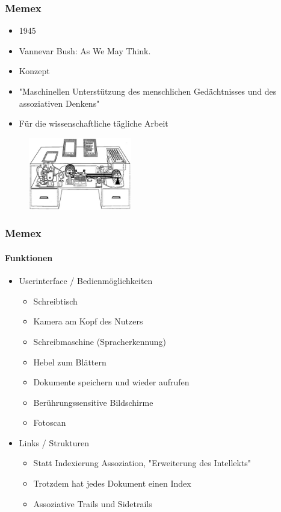 \begin{frame}
\frametitle{Memex}
	\begin{itemize}
		\item 1945
		\item Vannevar Bush: As We May Think.
		\item Konzept
		\item "Maschinellen Unterstützung des menschlichen Gedächtnisses und des assoziativen Denkens"
		\item Für die wissenschaftliche tägliche Arbeit
	\end{itemize}
	
	\begin{figure}[htbp]
		\centering
		\includegraphics[width=0.4\textwidth]{images/memex}
	\end{figure}

\end{frame}

\begin{frame}
	\frametitle{Memex}
	\framesubtitle{Funktionen}
	\begin{itemize}
		\item Userinterface / Bedienmöglichkeiten
		\begin{itemize}
			\item Schreibtisch
			\item Kamera am Kopf des Nutzers 
			\item Schreibmaschine (Spracherkennung)
			\item Hebel zum Blättern
			\item Dokumente speichern und wieder aufrufen
			\item Berührungssensitive Bildschirme
			\item Fotoscan
		\end{itemize}
		\item Links / Strukturen
		\begin{itemize}
			\item Statt Indexierung Assoziation, "Erweiterung des Intellekts"
			\item Trotzdem hat jedes Dokument einen Index
			\item Assoziative Trails und Sidetrails
		\end{itemize}
	\end{itemize}
\end{frame}
